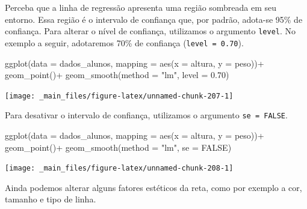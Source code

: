 \documentclass[
  brazilian,
]{book}
\newenvironment{Shaded}{\begin{snugshade}}{\end{snugshade}}
\newcommand{\AttributeTok}[1]{\textcolor[rgb]{0.77,0.63,0.00}{#1}}
\newcommand{\ConstantTok}[1]{\textcolor[rgb]{0.00,0.00,0.00}{#1}}
\newcommand{\FloatTok}[1]{\textcolor[rgb]{0.00,0.00,0.81}{#1}}
\newcommand{\FunctionTok}[1]{\textcolor[rgb]{0.00,0.00,0.00}{#1}}
\newcommand{\NormalTok}[1]{#1}
\newcommand{\SpecialCharTok}[1]{\textcolor[rgb]{0.00,0.00,0.00}{#1}}
\newcommand{\StringTok}[1]{\textcolor[rgb]{0.31,0.60,0.02}{#1}}
\begin{document}
Perceba que a linha de regressão apresenta uma região sombreada em seu entorno. Essa região é o intervalo de confiança que, por padrão, adota-se 95\% de confiança. Para alterar o nível de confiança, utilizamos o argumento \texttt{level}. No exemplo a seguir, adotaremos 70\% de confiança (\texttt{level\ =\ 0.70}).

\begin{Shaded}
\begin{Highlighting}[]
\FunctionTok{ggplot}\NormalTok{(}\AttributeTok{data =}\NormalTok{ dados\_alunos,}
       \AttributeTok{mapping =} \FunctionTok{aes}\NormalTok{(}\AttributeTok{x =}\NormalTok{ altura,}
                     \AttributeTok{y =}\NormalTok{ peso))}\SpecialCharTok{+}
  \FunctionTok{geom\_point}\NormalTok{()}\SpecialCharTok{+}
  \FunctionTok{geom\_smooth}\NormalTok{(}\AttributeTok{method =} \StringTok{"lm"}\NormalTok{, }
              \AttributeTok{level =} \FloatTok{0.70}\NormalTok{)}
\end{Highlighting}
\end{Shaded}

\begin{center}\texttt{[image: \_main\_files/figure-latex/unnamed-chunk-207-1]} \end{center}

Para desativar o intervalo de confiança, utilizamos o argumento \texttt{se\ =\ FALSE}.

\begin{Shaded}
\begin{Highlighting}[]
\FunctionTok{ggplot}\NormalTok{(}\AttributeTok{data =}\NormalTok{ dados\_alunos,}
       \AttributeTok{mapping =} \FunctionTok{aes}\NormalTok{(}\AttributeTok{x =}\NormalTok{ altura,}
                     \AttributeTok{y =}\NormalTok{ peso))}\SpecialCharTok{+}
  \FunctionTok{geom\_point}\NormalTok{()}\SpecialCharTok{+}
  \FunctionTok{geom\_smooth}\NormalTok{(}\AttributeTok{method =} \StringTok{"lm"}\NormalTok{,}
              \AttributeTok{se =} \ConstantTok{FALSE}\NormalTok{)}
\end{Highlighting}
\end{Shaded}

\begin{center}\texttt{[image: \_main\_files/figure-latex/unnamed-chunk-208-1]} \end{center}

Ainda podemos alterar alguns fatores estéticos da reta, como por exemplo a cor, tamanho e tipo de linha.
\end{document}
